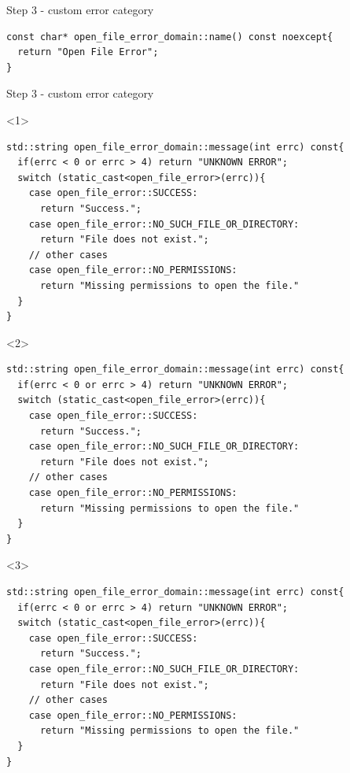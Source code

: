 \documentclass[10pt]{beamer}
\begin{document}
\begin{frame}[fragile]{Step 3 - custom error category}
\begin{verbatim}
const char* open_file_error_domain::name() const noexcept{
  return "Open File Error";
}
\end{verbatim}
\end{frame}

\begin{frame}[fragile]{Step 3 - custom error category}
	\begin{onlyenv}
	\begin{verbatim}
std::string open_file_error_domain::message(int errc) const{
  if(errc < 0 or errc > 4) return "UNKNOWN ERROR";
  switch (static_cast<open_file_error>(errc)){
    case open_file_error::SUCCESS:
      return "Success.";
    case open_file_error::NO_SUCH_FILE_OR_DIRECTORY:
      return "File does not exist.";
    // other cases
    case open_file_error::NO_PERMISSIONS:
      return "Missing permissions to open the file."
  }
}
	\end{verbatim}
	\end{onlyenv}

	\begin{onlyenv}
	\begin{verbatim}
std::string open_file_error_domain::message(int errc) const{
  if(errc < 0 or errc > 4) return "UNKNOWN ERROR";
  switch (static_cast<open_file_error>(errc)){
    case open_file_error::SUCCESS:
      return "Success.";
    case open_file_error::NO_SUCH_FILE_OR_DIRECTORY:
      return "File does not exist.";
    // other cases
    case open_file_error::NO_PERMISSIONS:
      return "Missing permissions to open the file."
  }
}
	\end{verbatim}
	\end{onlyenv}

	\begin{onlyenv}
	\begin{verbatim}
std::string open_file_error_domain::message(int errc) const{
  if(errc < 0 or errc > 4) return "UNKNOWN ERROR";
  switch (static_cast<open_file_error>(errc)){
    case open_file_error::SUCCESS:
      return "Success.";
    case open_file_error::NO_SUCH_FILE_OR_DIRECTORY:
      return "File does not exist.";
    // other cases
    case open_file_error::NO_PERMISSIONS:
      return "Missing permissions to open the file."
  }
}
\end{verbatim}
	\end{onlyenv}


\end{frame}
\end{document}
